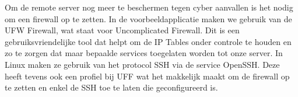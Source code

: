 %            
%        
%        
            
            Om de remote server nog meer te beschermen tegen cyber aanvallen is het nodig om een firewall op te zetten. In de voorbeeldapplicatie maken we gebruik van de UFW Firewall, wat staat voor Uncomplicated Firewall. Dit is een gebruiksvriendelijke tool dat helpt om de IP Tables onder controle te houden en zo te zorgen dat maar bepaalde services toegelaten worden tot onze server.
            In Linux maken ze gebruik van het protocol SSH via de service OpenSSH. Deze heeft tevens ook een profiel bij UFF wat het makkelijk maakt om de firewall op te zetten en enkel de SSH toe te laten die geconfigureerd is.
%            
%            
%    
